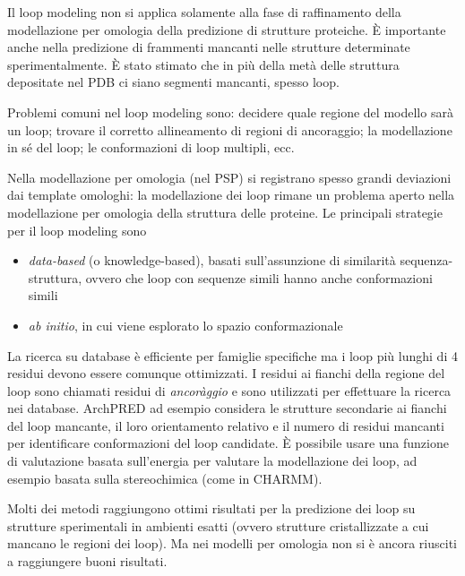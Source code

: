 Il loop modeling non si applica solamente alla fase di raffinamento della modellazione per omologia della predizione di strutture proteiche. È importante anche nella predizione di frammenti mancanti nelle strutture determinate sperimentalmente. È stato stimato che in più della metà delle struttura depositate nel PDB ci siano segmenti mancanti, spesso loop\supercite{karami2018dareus}.

\par Problemi comuni nel loop modeling sono: decidere quale regione del modello sarà un loop; trovare il corretto allineamento di regioni di ancoraggio; la modellazione in sé del loop; le conformazioni di loop multipli, ecc.

\par Nella modellazione per omologia (nel PSP) si registrano spesso grandi deviazioni dai template omologhi: la modellazione dei loop rimane un problema aperto nella modellazione per omologia della struttura delle proteine\supercite{karamiLoop}. Le principali strategie per il loop modeling sono
\begin{itemize}
	\item \textit{data-based} (o knowledge-based), basati sull'assunzione di similarità sequenza-struttura, ovvero che loop con sequenze simili hanno anche conformazioni simili
	\item \textit{ab initio}, in cui viene esplorato lo spazio conformazionale
\end{itemize}

La ricerca su database è efficiente per famiglie specifiche ma i loop più lunghi di 4 residui devono essere comunque ottimizzati. I residui ai fianchi della regione del loop sono chiamati residui di \textit{ancoràggio} e sono utilizzati per effettuare la ricerca nei database. ArchPRED ad esempio considera le strutture secondarie ai fianchi del loop mancante, il loro orientamento relativo e il numero di residui mancanti per identificare conformazioni del loop candidate. È possibile usare una funzione di valutazione basata sull'energia per valutare la modellazione dei loop, ad esempio basata sulla stereochimica (come in CHARMM). 

\par Molti dei metodi raggiungono ottimi risultati per la predizione dei loop su strutture sperimentali in ambienti esatti (ovvero strutture cristallizzate a cui mancano le regioni dei loop). Ma nei modelli per omologia non si è ancora riusciti a raggiungere buoni risultati\supercite{karami2018dareus}. 

